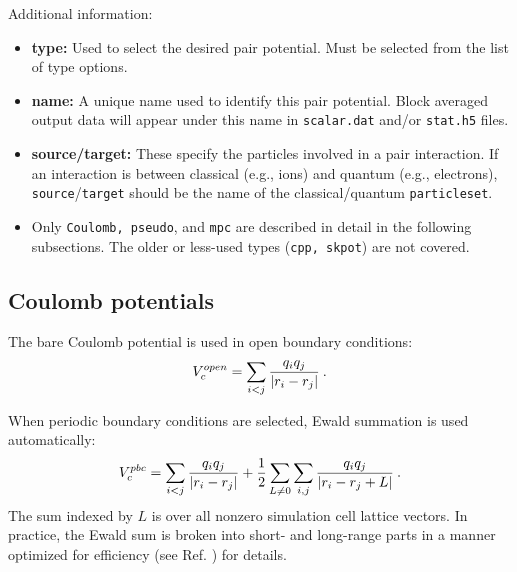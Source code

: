 Additional information:
\begin{itemize}
  \item{\textbf{type:} Used to select the desired pair potential.  Must be selected from the list of type options.}
  \item{\textbf{name:} A unique name used to identify this pair potential.  Block averaged output data will appear under this name in \texttt{scalar.dat} and/or \texttt{stat.h5} files.}
  \item{\textbf{source/target:}  These specify the particles involved in a pair interaction.  If an interaction is between classical (e.g., ions) and quantum (e.g., electrons), \texttt{source}/\texttt{target} should be the name of the classical/quantum \texttt{particleset}.}
  \item{Only \texttt{Coulomb, pseudo}, and \texttt{mpc} are described in detail in the following subsections.  The older or less-used types (\texttt{cpp, skpot}) are not covered.}
\end{itemize}







\subsection{Coulomb potentials}

The bare Coulomb potential is used in open boundary conditions:
\begin{align}
  V_c^{open} = \sum_{i<j}\frac{q_iq_j}{\abs{r_i-r_j}}\:.
\end{align}

When periodic boundary conditions are selected, Ewald summation is used automatically:
\begin{align}\label{eq:ewald}
  V_c^{pbc} = \sum_{i<j}\frac{q_iq_j}{\abs{r_i-r_j}} + \frac{1}{2}\sum_{L\ne0}\sum_{i,j}\frac{q_iq_j}{\abs{r_i-r_j+L}}\:.
\end{align}
The sum indexed by $L$ is over all nonzero simulation cell lattice vectors.  In practice, the Ewald sum is broken into short- and long-range parts in a manner optimized for efficiency (see Ref. \cite{Natoli1995}) for details. 

